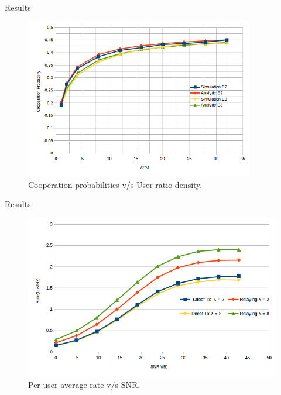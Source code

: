 \documentclass{beamer}
\begin{document}
\begin{frame}{Results}
\begin{figure}[!h]
\includegraphics[width=10cm, height= 7cm]{figures/coopP.png}
\centering
\vspace{-2mm}
\caption{Cooperation probabilities v/s User ratio density. } 
\label{plot2}
\end{figure}
\end{frame}


\begin{frame}{Results}
\begin{figure}[!h]
\includegraphics[width=\textwidth]{figures/rates.png}
\centering
\vspace{-2mm}
\caption{Per user average rate v/s SNR.}
\label{plot3}
\end{figure}
\end{frame}






\end{document}
